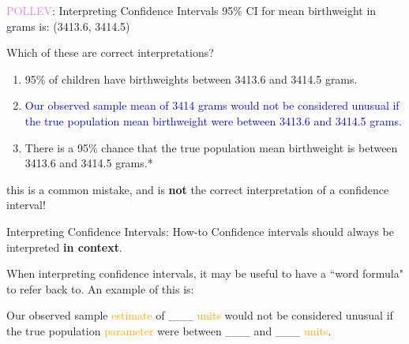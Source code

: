 \documentclass[10pt,t]{beamer}
\begin{document}
\begin{frame}{\textcolor{violet}{POLLEV}: Interpreting Confidence Intervals}
95\% CI for mean birthweight in grams is: (3413.6, 3414.5)

\vspace{0.3cm}

Which of these are correct interpretations?

\vspace{0.3cm}

\begin{enumerate}
	\item 95\% of children have birthweights between 3413.6 and 3414.5 grams.
	\medskip
	\item \textcolor{blue}{Our observed sample mean of 3414 grams would not be considered unusual if the true population mean birthweight were between 3413.6 and 3414.5 grams.}
	\medskip
	\item There is a 95\% chance that the true population mean birthweight is between 3413.6 and 3414.5 grams.*
\end{enumerate}

\small *this is a common mistake, and is \textbf{not} the correct interpretation of a confidence interval!

\end{frame}

\begin{frame}{Interpreting Confidence Intervals: How-to}
Confidence intervals should always be interpreted \textbf{in context}.

\vspace{0.3cm}

When interpreting confidence intervals, it may be useful to have a ``word formula" to refer back to. An example of this is:

\vspace{0.3cm}

Our observed sample \textcolor{orange}{estimate} of \_\_\_ \textcolor{orange}{units} would not be considered unusual if the true population \textcolor{orange}{parameter} were between \_\_\_ and \_\_\_ \textcolor{orange}{units}.

\end{frame}
\end{document}
